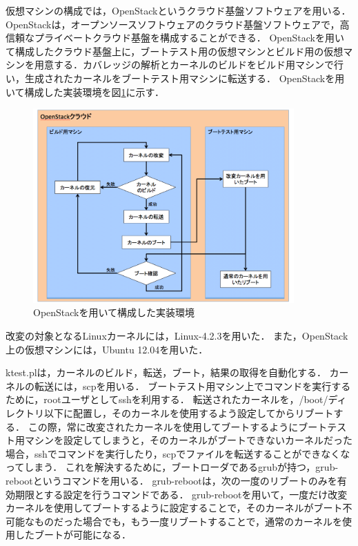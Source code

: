\documentclass[graduation-thesis]{mlarticle}
\begin{document}
仮想マシンの構成では，OpenStackというクラウド基盤ソフトウェアを用いる．
OpenStackは，オープンソースソフトウェアのクラウド基盤ソフトウェアで，高信頼なプライベートクラウド基盤を構成することができる．
OpenStackを用いて構成したクラウド基盤上に，ブートテスト用の仮想マシンとビルド用の仮想マシンを用意する．カバレッジの解析とカーネルのビルドをビルド用マシンで行い，生成されたカーネルをブートテスト用マシンに転送する．
OpenStackを用いて構成した実装環境を図\ref{fig:openstackenv}に示す．

\begin{figure}[H]
  \begin{center}
    \includegraphics[width=10.0cm]{images/openstackenv.png}
    \caption{OpenStackを用いて構成した実装環境}
    \label{fig:openstackenv}
  \end{center}
\end{figure}

改変の対象となるLinuxカーネルには，Linux-4.2.3を用いた．
また，OpenStack上の仮想マシンには，Ubuntu 12.04を用いた．

ktest.plは，カーネルのビルド，転送，ブート，結果の取得を自動化する．
カーネルの転送には，scpを用いる．
ブートテスト用マシン上でコマンドを実行するために，rootユーザとしてsshを利用する．
転送されたカーネルを，/boot/ディレクトリ以下に配置し，そのカーネルを使用するよう設定してからリブートする．
この際，常に改変されたカーネルを使用してブートするようにブートテスト用マシンを設定してしまうと，そのカーネルがブートできないカーネルだった場合，sshでコマンドを実行したり，scpでファイルを転送することができなくなってしまう．
これを解決するために，ブートローダであるgrubが持つ，grub-rebootというコマンドを用いる．
grub-rebootは，次の一度のリブートのみを有効期限とする設定を行うコマンドである．
grub-rebootを用いて，一度だけ改変カーネルを使用してブートするように設定することで，そのカーネルがブート不可能なものだった場合でも，もう一度リブートすることで，通常のカーネルを使用したブートが可能になる．
\end{document}
